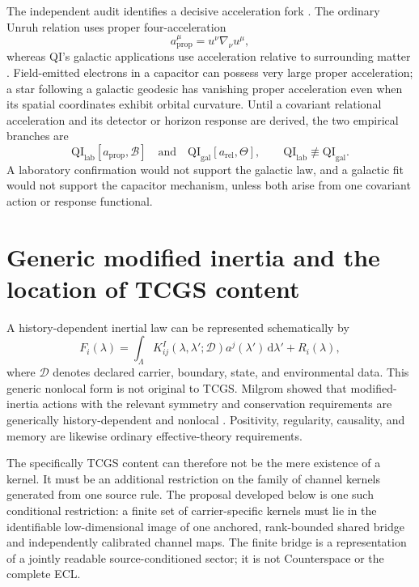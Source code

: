 \documentclass[11pt]{article}
\newcommand{\dd}{\mathrm{d}}
\newcommand{\Bdy}{\mathcal{B}}
\newcommand{\QI}{\mathrm{QI}}
\begin{document}
The independent audit identifies a decisive acceleration fork \cite{ArellanoQIAudit2026}. The ordinary Unruh relation uses proper four-acceleration
\begin{equation}
a^{\mu}_{\mathrm{prop}}=u^{\nu}\nabla_{\nu}u^{\mu},
\end{equation}
whereas QI's galactic applications use acceleration relative to surrounding matter \cite{McCulloch2016}. Field-emitted electrons in a capacitor can possess very large proper acceleration; a star following a galactic geodesic has vanishing proper acceleration even when its spatial coordinates exhibit orbital curvature. Until a covariant relational acceleration and its detector or horizon response are derived, the two empirical branches are
\begin{equation}
\QI_{\mathrm{lab}}[a_{\mathrm{prop}},\Bdy]
\quad\text{and}\quad
\QI_{\mathrm{gal}}[a_{\mathrm{rel}},\Theta],
\qquad
\QI_{\mathrm{lab}}\not\equiv\QI_{\mathrm{gal}}.
\label{eq:branch_split}
\end{equation}
A laboratory confirmation would not support the galactic law, and a galactic fit would not support the capacitor mechanism, unless both arise from one covariant action or response functional.

\section{Generic modified inertia and the location of TCGS content}

A history-dependent inertial law can be represented schematically by
\begin{equation}
F_i(\lambda)
=\int_{\Lambda}
K^{I}_{ij}(\lambda,\lambda';\mathcal D)
 a^{j}(\lambda')\,\dd\lambda'
+R_i(\lambda),
\label{eq:generic_kernel}
\end{equation}
where \(\mathcal D\) denotes declared carrier, boundary, state, and environmental data. This generic nonlocal form is not original to TCGS. Milgrom showed that modified-inertia actions with the relevant symmetry and conservation requirements are generically history-dependent and nonlocal \cite{Milgrom1994}. Positivity, regularity, causality, and memory are likewise ordinary effective-theory requirements.

The specifically TCGS content can therefore not be the mere existence of a kernel. It must be an additional restriction on the family of channel kernels generated from one source rule. The proposal developed below is one such conditional restriction: a finite set of carrier-specific kernels must lie in the identifiable low-dimensional image of one anchored, rank-bounded shared bridge and independently calibrated channel maps. The finite bridge is a representation of a jointly readable source-conditioned sector; it is not Counterspace or the complete ECL.
\end{document}
